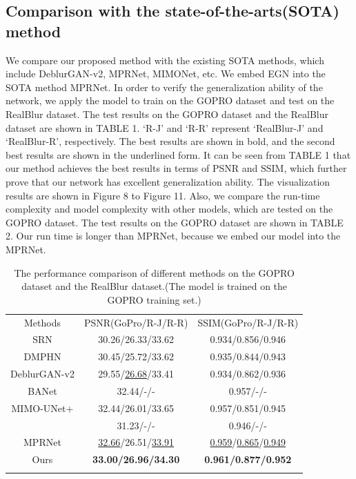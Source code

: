 \begin{sloppypar}
\subsection{Comparison with the state-of-the-arts(SOTA) method}
We compare our proposed method with the existing SOTA methods, which include DeblurGAN-v2\cite{18},  MPRNet\cite{7}, MIMONet\cite{9}, etc. We embed EGN into the SOTA method MPRNet. In order to verify the generalization ability of the network, we apply the model to train on the GOPRO dataset and test on the RealBlur dataset. The test results on the GOPRO dataset and the RealBlur dataset are shown in TABLE 1. ‘R-J’ and ‘R-R’ represent ‘RealBlur-J’ and ‘RealBlur-R’, respectively. The best results are shown in bold, and the second best results are shown in the underlined form. It can be seen from TABLE 1 that our method achieves the best results in terms of PSNR and SSIM, which further prove that our network has excellent generalization ability. The visualization results are shown in Figure 8 to Figure 11. Also, we compare the run-time complexity and model complexity with other models, which are tested on the GOPRO dataset. The test results on the GOPRO dataset are shown in TABLE 2. Our run time is longer than MPRNet, because we embed our model into the MPRNet.
\begin{table}[!t]
\renewcommand{\arraystretch}{1.3}
\caption{The performance comparison of different methods on the GOPRO dataset and the RealBlur dataset.(The model is trained on the GOPRO training set.)}
\label{table1}
\centering
\begin{tabular}{ccc}
\hline\noalign{\smallskip}
Methods & PSNR(GoPro/R-J/R-R) & SSIM(GoPro/R-J/R-R)  \\
\noalign{\smallskip}\hline\noalign{\smallskip}
SRN & 30.26/26.33/33.62 & 0.934/0.856/0.946 \\
DMPHN & 30.45/25.72/33.62 & 0.935/0.844/0.943 \\
DeblurGAN-v2 & 29.55/\underline{26.68}/33.41 & 0.934/0.862/0.936 \\
BANet & 32.44/-/- & 0.957/-/- \\
MIMO-UNet+ & 32.44/26.01/33.65 & 0.957/0.851/0.945 \\
\cite{26} & 31.23/-/- & 0.946/-/- \\
MPRNet & \underline{32.66}/26.51/\underline{33.91} & \underline{0.959}/\underline{0.865}/\underline{0.949} \\
Ours & \bf{33.00/26.96/34.30} & \bf{0.961/0.877/0.952} \\
\noalign{\smallskip}\hline
\end{tabular}
\end{table}


\end{sloppypar}
